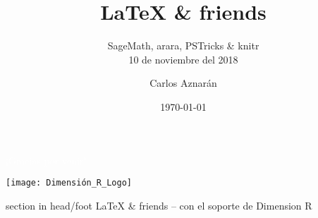\documentclass[spanish,9pt]{beamer}
\title[\LaTeX{} \& Friends]{\LaTeX{} \& friends}
\subtitle{SageMath, arara, PSTricks \& knitr\\[\baselineskip]
10 de noviembre del 2018}
\author[Dimension R]{Carlos Aznarán}
\institute[Universidad Nacional de Ingeniería]{
Matemáticas\\
  Facultad de Ciencias\\
  Universidad Nacional de Ingeniería}
\date[\today]{
 \today}
\begin{document}
\begin{frame}
  \titlepage
\end{frame}

\begin{frame}
  \frametitle{\contentsname}

  \tableofcontents
\end{frame}


%
%
%
%
%

\begin{frame}[plain, b]
\centering
\huge \textcolor{white}{¡Gracias por venir!}
\normalsize
\begin{center}
	\texttt{[image: Dimensión\_R\_Logo]}\\
\end{center}
\vspace*{\fill}

 \begin{beamercolorbox}[wd=\paperwidth]{section in head/foot}
 \centering\large
\LaTeX{} \& friends -- con el soporte de Dimension R
\vskip10pt
\end{beamercolorbox}
 \end{frame}
\end{document}
